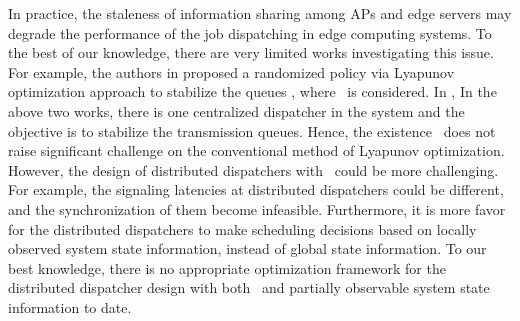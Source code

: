 In practice, the staleness of information sharing among APs and edge servers may degrade the performance of the job dispatching in edge computing systems.
To the best of our knowledge, there are very limited works investigating this issue.
For example, the authors in \cite{JSAC17-LyuX} proposed a randomized policy via Lyapunov optimization approach to stabilize the queues , where \brlatency~is considered. 
In \cite{TWC18-LyuX}, 
In the above two works, there is one centralized dispatcher in the system and the objective is to stabilize the transmission queues.
Hence, the existence \brlatency~does not raise significant challenge on the conventional method of Lyapunov optimization.
However, the design of distributed dispatchers with \brlatency~could be more challenging.
For example, the signaling latencies at distributed dispatchers could be different, and the synchronization of them become infeasible.
Furthermore, it is more favor for the distributed dispatchers to make scheduling decisions based on locally observed system state information, instead of global state information.
To our best knowledge, there is no appropriate optimization framework for the distributed dispatcher design with both \brlatency~and partially observable system state information to date.

